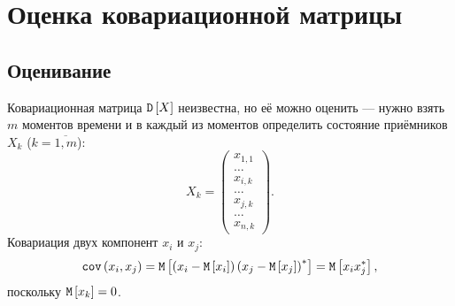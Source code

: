 \section{Оценка ковариационной матрицы}

\subsection{Оценивание}

Ковариационная матрица $\mathtt{D} \left [ X \right ]$ неизвестна, но её можно оценить --- нужно взять $m$ моментов времени и в каждый из моментов определить состояние приёмников $X_k$
($k = \overline{1,m}$):
\[
    X_k =
    \begin{pmatrix}
        x_{1,1} \\
        \dots   \\
        x_{i,k} \\
        \dots   \\
        x_{j,k} \\
        \dots   \\
        x_{n,k}
    \end{pmatrix} .
\]
Ковариация двух компонент $x_i$ и $x_j$:
\[
    \mathtt{cov} \left ( x_i, x_j \right )
    = \mathtt{M} \left [ \left( x_i - \mathtt{M} \left [ x_i \right ] \right) \left( x_j - \mathtt{M} \left [ x_j \right ] \right)^* \right ]
    = \mathtt{M} \left [  x_i x_j^* \right ],
\]
поскольку $\mathtt{M} \left [ x_k \right ] = 0$.

